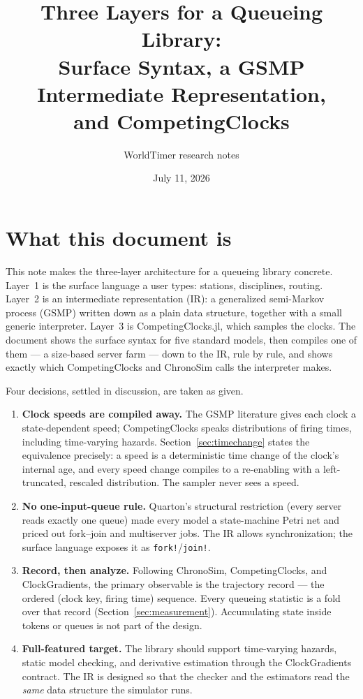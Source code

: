 \documentclass[11pt]{article}
\title{Three Layers for a Queueing Library:\\
Surface Syntax, a GSMP Intermediate Representation,\\
and CompetingClocks}
\author{WorldTimer research notes}
\date{July 11, 2026}
\newcommand{\code}[1]{\texttt{#1}}
\begin{document}
\maketitle
\tableofcontents

\section{What this document is}

This note makes the three-layer architecture for a queueing library concrete.
Layer~1 is the surface language a user types: stations, disciplines, routing.
Layer~2 is an intermediate representation (IR): a generalized semi-Markov
process (GSMP) written down as a plain data structure, together with a small
generic interpreter. Layer~3 is CompetingClocks.jl, which samples the clocks.
The document shows the surface syntax for five standard models, then compiles
one of them --- a size-based server farm --- down to the IR, rule by rule, and
shows exactly which CompetingClocks and ChronoSim calls the interpreter makes.

Four decisions, settled in discussion, are taken as given.

\begin{enumerate}
\item \textbf{Clock speeds are compiled away.} The GSMP literature gives each
  clock a state-dependent speed; CompetingClocks speaks distributions of firing
  times, including time-varying hazards. Section~\ref{sec:timechange} states
  the equivalence precisely: a speed is a deterministic time change of the
  clock's internal age, and every speed change compiles to a re-enabling with a
  left-truncated, rescaled distribution. The sampler never sees a speed.
\item \textbf{No one-input-queue rule.} Quarton's structural restriction
  (every server reads exactly one queue) made every model a state-machine
  Petri net and priced out fork--join and multiserver jobs. The IR allows
  synchronization; the surface language exposes it as \code{fork!}/\code{join!}.
\item \textbf{Record, then analyze.} Following ChronoSim, CompetingClocks, and
  ClockGradients, the primary observable is the trajectory record --- the
  ordered (clock key, firing time) sequence. Every queueing statistic is a fold
  over that record (Section~\ref{sec:measurement}). Accumulating state inside
  tokens or queues is not part of the design.
\item \textbf{Full-featured target.} The library should support time-varying
  hazards, static model checking, and derivative estimation through the
  ClockGradients contract. The IR is designed so that the checker and the
  estimators read the \emph{same} data structure the simulator runs.
\end{enumerate}
\end{document}
